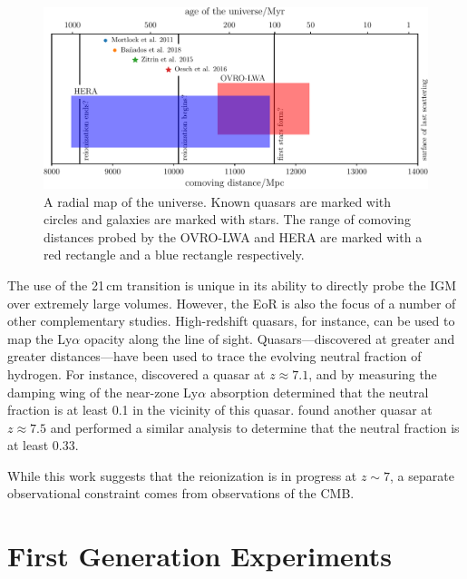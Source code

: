 \begin{bibunit}
\begin{figure}[t]
    \centering
    \includegraphics[width=\textwidth]{figures/chapter1/history-of-the-universe/history-of-the-universe}
    \caption{
        A radial map of the universe. Known quasars are marked with circles and galaxies are marked
        with stars. The range of comoving distances probed by the OVRO-LWA and HERA are marked with
        a red rectangle and a blue rectangle respectively.
    }
    \label{fig:history-of-the-universe}
\end{figure}

The use of the 21\,cm transition is unique in its ability to directly probe the IGM over extremely
large volumes. However, the EoR is also the focus of a number of other complementary studies.
High-redshift quasars, for instance, can be used to map the Ly$\alpha$ opacity along the line of
sight. Quasars---discovered at greater and greater distances---have been used to trace the evolving
neutral fraction of hydrogen.  For instance, \citet{2011Natur.474..616M} discovered a quasar at
$z\approx7.1$, and by measuring the damping wing of the near-zone Ly$\alpha$ absorption determined
that the neutral fraction is at least 0.1 in the vicinity of this quasar.
\citet{2018Natur.553..473B} found another quasar at $z\approx7.5$ and performed a similar analysis
to determine that the neutral fraction is at least 0.33.

While this work suggests that the reionization is in progress at $z\sim 7$, a separate observational
constraint comes from observations of the CMB.



\section{First Generation Experiments}


\end{bibunit}

